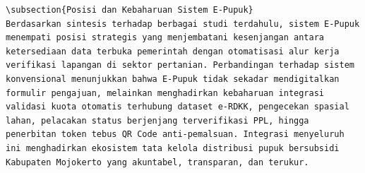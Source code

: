 \documentclass[conference]{IEEEtran}
\begin{document}
\begin{lstlisting}
\subsection{Posisi dan Kebaharuan Sistem E-Pupuk}
Berdasarkan sintesis terhadap berbagai studi terdahulu, sistem E-Pupuk menempati posisi strategis yang menjembatani kesenjangan antara ketersediaan data terbuka pemerintah dengan otomatisasi alur kerja verifikasi lapangan di sektor pertanian. Perbandingan terhadap sistem konvensional menunjukkan bahwa E-Pupuk tidak sekadar mendigitalkan formulir pengajuan, melainkan menghadirkan kebaharuan integrasi validasi kuota otomatis terhubung dataset e-RDKK, pengecekan spasial lahan, pelacakan status berjenjang terverifikasi PPL, hingga penerbitan token tebus QR Code anti-pemalsuan. Integrasi menyeluruh ini menghadirkan ekosistem tata kelola distribusi pupuk bersubsidi Kabupaten Mojokerto yang akuntabel, transparan, dan terukur.


\end{lstlisting}
\end{document}
